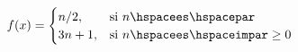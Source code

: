\documentclass[preview]{standalone}
\begin{document}
\begin{align*}
f(x) = \begin{cases} n/2, & \text{si } n\hspacees\hspacepar \\ 3n+1, & \text{si } n\hspacees\hspaceimpar \geq 0 \end{cases}
\end{align*}
\end{document}
